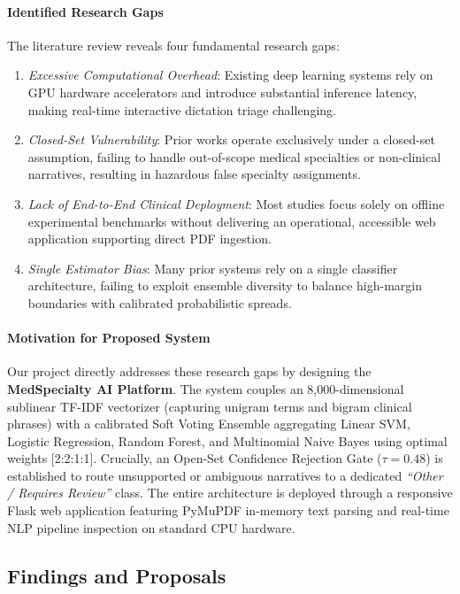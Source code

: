 \paragraph{Identified Research Gaps}
The literature review reveals four fundamental research gaps:
\begin{enumerate}
    \item \textit{Excessive Computational Overhead}: Existing deep learning systems rely on GPU hardware accelerators and introduce substantial inference latency, making real-time interactive dictation triage challenging.
    \item \textit{Closed-Set Vulnerability}: Prior works operate exclusively under a closed-set assumption, failing to handle out-of-scope medical specialties or non-clinical narratives, resulting in hazardous false specialty assignments.
    \item \textit{Lack of End-to-End Clinical Deployment}: Most studies focus solely on offline experimental benchmarks without delivering an operational, accessible web application supporting direct PDF ingestion.
    \item \textit{Single Estimator Bias}: Many prior systems rely on a single classifier architecture, failing to exploit ensemble diversity to balance high-margin boundaries with calibrated probabilistic spreads.
\end{enumerate}

\paragraph{Motivation for Proposed System}
Our project directly addresses these research gaps by designing the \textbf{MedSpecialty AI Platform}. The system couples an 8,000-dimensional sublinear TF-IDF vectorizer (capturing unigram terms and bigram clinical phrases) with a calibrated Soft Voting Ensemble aggregating Linear SVM, Logistic Regression, Random Forest, and Multinomial Naive Bayes using optimal weights [2:2:1:1]. Crucially, an Open-Set Confidence Rejection Gate ($\tau = 0.48$) is established to route unsupported or ambiguous narratives to a dedicated \textit{``Other / Requires Review''} class. The entire architecture is deployed through a responsive Flask web application featuring PyMuPDF in-memory text parsing and real-time NLP pipeline inspection on standard CPU hardware.

\subsection{Findings and Proposals}

